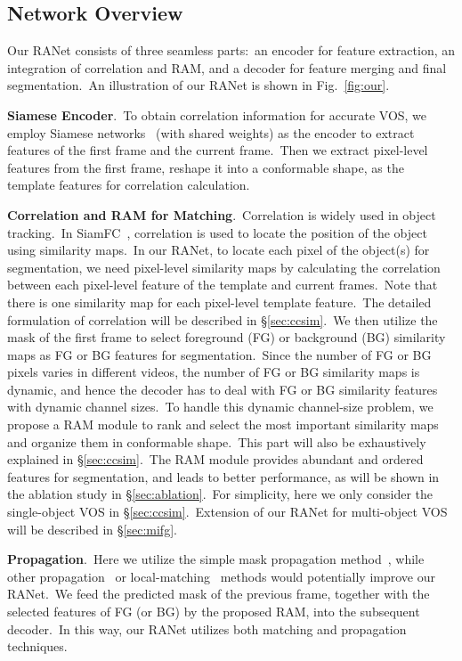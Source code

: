 \documentclass[10pt,twocolumn,letterpaper]{article}
\begin{document}
\subsection{Network Overview}
\label{sec:networkoverview}
Our RANet consists of three seamless parts:\ an encoder for feature extraction, an integration of correlation and RAM, and a decoder for feature merging and final segmentation.\ An illustration of our RANet is shown in Fig.~\ref{fig:our}.





\noindent
\textbf{Siamese Encoder}.\ 
To obtain correlation information for accurate VOS, we employ Siamese networks~\cite{siamfc} (with shared weights) as the encoder to extract features of the first frame and the current frame.\
Then we extract pixel-level features from the first frame, reshape it into a conformable shape, as the template features for correlation calculation.

\noindent
\textbf{Correlation and RAM for Matching}.\
Correlation is widely used in object tracking.\ In SiamFC~\cite{siamfc}, correlation is used to locate the position of the object using similarity maps.\ In our RANet, to locate each pixel of the object(s) for segmentation, we need pixel-level similarity maps by calculating the correlation between each pixel-level feature of the template and current frames.\ Note that there is one similarity map for each pixel-level template feature.\ The detailed formulation of correlation will be described in \S\ref{sec:ccsim}.\ We then utilize the mask of the first frame to select foreground (FG) or background (BG) similarity maps as FG or BG features for segmentation.\ Since the number of FG or BG pixels varies in different videos, the number of FG or BG similarity maps is dynamic, and hence the decoder has to deal with FG or BG similarity features with dynamic channel sizes.\ To handle this dynamic channel-size problem, we propose a RAM module to rank and select the most important similarity maps and organize them in conformable shape.\ This part will also be exhaustively explained in \S\ref{sec:ccsim}.\
The RAM module provides abundant and ordered features for segmentation, and leads to better performance, as will be shown in the ablation study in \S\ref{sec:ablation}.\ For simplicity, here we only consider the single-object VOS in \S\ref{sec:ccsim}.\ Extension of our RANet for multi-object VOS will be described in \S\ref{sec:mifg}.\ 


\noindent
\textbf{Propagation}.\ 
Here we utilize the simple mask propagation method~\cite{masktrack}, while other propagation~\cite{reid, flownet2} or local-matching~\cite{Voigtlaender2019FEELVOS} methods would potentially improve our RANet.\ 
We feed the predicted mask of the previous frame, together with the selected features of FG (or BG) by the proposed RAM, into the subsequent decoder.\ In this way, our RANet utilizes both matching and propagation techniques. 
\end{document}
